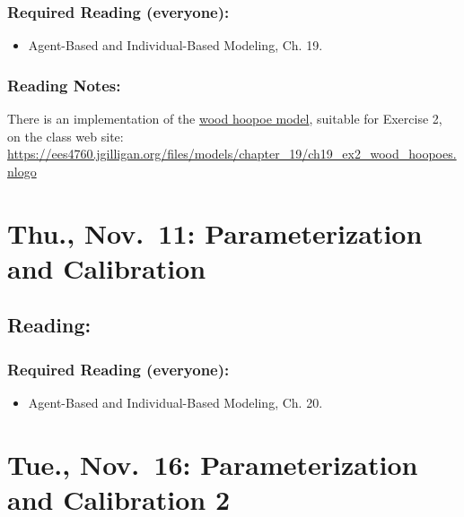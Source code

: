 \documentclass[
]{article}
\providecommand{\tightlist}{%
  \setlength{\itemsep}{0pt}\setlength{\parskip}{0pt}}
\begin{document}
\hypertarget{required-reading-everyone-17}{%
\subsubsection{Required Reading
(everyone):}\label{required-reading-everyone-17}}

\begin{itemize}
\tightlist
\item
  Agent-Based and Individual-Based Modeling, Ch. 19.
\end{itemize}

\hypertarget{reading-notes-14}{%
\subsubsection{Reading Notes:}\label{reading-notes-14}}

There is an implementation of the
\href{/files/models/chapter_19/ch19_ex2_wood_hoopoes.nlogo}{wood hoopoe
model}, suitable for Exercise 2, on the class web site:
\url{https://ees4760.jgilligan.org/files/models/chapter_19/ch19_ex2_wood_hoopoes.nlogo}

\hypertarget{thu.-nov.-11-parameterization-and-calibration}{%
\section{Thu., Nov.~11: Parameterization and
Calibration}\label{thu.-nov.-11-parameterization-and-calibration}}

\hypertarget{reading-21}{%
\subsection{Reading:}\label{reading-21}}

\hypertarget{required-reading-everyone-18}{%
\subsubsection{Required Reading
(everyone):}\label{required-reading-everyone-18}}

\begin{itemize}
\tightlist
\item
  Agent-Based and Individual-Based Modeling, Ch. 20.
\end{itemize}

\hypertarget{tue.-nov.-16-parameterization-and-calibration-2}{%
\section{Tue., Nov.~16: Parameterization and Calibration
2}\label{tue.-nov.-16-parameterization-and-calibration-2}}
\end{document}
